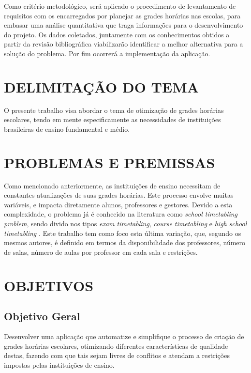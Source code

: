 Como critério metodológico, será aplicado o procedimento de levantamento de requisitos com os encarregados por planejar as grades horárias nas escolas, para embasar uma análise quantitativa que traga informações para o desenvolvimento do projeto. Os dados coletados, juntamente com os conhecimentos obtidos a partir da revisão bibliográfica viabilizarão identificar a melhor alternativa para a solução do problema. Por fim ocorrerá a implementação da aplicação.

\section{DELIMITAÇÃO DO TEMA}
\label{sec:antesleiame}

O presente trabalho visa abordar o tema de otimização de grades horárias escolares, tendo em mente especificamente as necessidades de instituições brasileiras de ensino fundamental e médio. 

\section{PROBLEMAS E PREMISSAS}
\label{sec:organizacaoTrabalho}

Como mencionado anteriormente, as instituições de ensino necessitam de constantes atualizações de suas grades horárias. Este processo envolve muitas variáveis, e impacta diretamente alunos, professores e gestores. Devido a esta complexidade, o problema já é conhecido na literatura como \textit{school timetabling problem}, sendo divido nos tipos \textit{exam timetabling}, \textit{course timetabling} e \textit{high school timetabling} \cite{TAN2021113943}. Este trabalho tem como foco esta última variação, que, segundo os mesmos autores, é definido em termos da disponibilidade dos professores, número de salas, número de aulas por professor em cada sala e restrições.

\section{OBJETIVOS}
\subsection{Objetivo Geral}

Desenvolver uma aplicação que automatize e simplifique o processo de criação de grades horárias escolares, otimizando diferentes características de qualidade destas, fazendo com que tais sejam livres de conflitos e atendam a restrições impostas pelas instituições de ensino.


